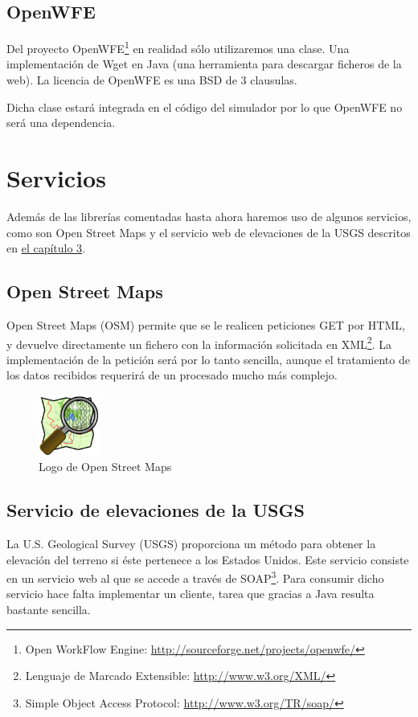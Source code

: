 \subsection*{OpenWFE}

Del proyecto OpenWFE\footnote{Open WorkFlow Engine:
\url{http://sourceforge.net/projects/openwfe/}} en realidad sólo utilizaremos
una clase. Una implementación de Wget en Java (una herramienta para descargar
ficheros de la web). La licencia de OpenWFE es una BSD de 3 clausulas.

Dicha clase estará integrada en el código del simulador por lo que OpenWFE no
será una dependencia.

\section*{Servicios}

Además de las librerías comentadas hasta ahora haremos uso de algunos
servicios, como son Open Street Maps y el servicio web de elevaciones de la
USGS descritos en \hyperref[cap3]{el capítulo 3}.

\subsection*{Open Street Maps}

Open Street Maps (OSM)\cite{Pinto09} permite que se le realicen peticiones GET
por HTML, y
devuelve directamente un fichero con la información solicitada en
XML\footnote{Lenguaje de Marcado Extensible: \url{http://www.w3.org/XML/}}. La
implementación de la petición será por lo tanto sencilla, aunque el tratamiento
de los datos recibidos requerirá de un procesado mucho más complejo.

\begin{figure}[H]
 \centering
 \includegraphics[width=20mm]{figuras/cap4/osm.png}
 \caption{Logo de Open Street Maps}
\end{figure}

\subsection*{Servicio de elevaciones de la USGS}

La U.S. Geological Survey (USGS) proporciona un método para obtener la elevación
del terreno si éste pertenece a los Estados Unidos. Este servicio consiste en un
servicio web al que se accede a través de SOAP\footnote{Simple Object Access
Protocol: \url{http://www.w3.org/TR/soap/}}. Para consumir dicho servicio hace
falta implementar un cliente, tarea que gracias a Java resulta bastante
sencilla.

